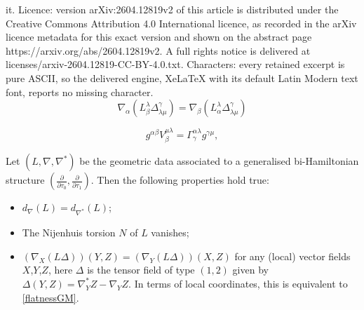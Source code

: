 \documentclass[10pt,a4paper]{amsart}
\newcommand{\Qd}{\Delta}
\newcommand{\Qg}{\Gamma}
\newcommand{\diff}[2]{\frac{\partial #1}{\partial #2}}
\newcommand{\qa}{\alpha}
\newcommand{\qb}{\beta}
\newcommand{\qg}{\gamma}
\newcommand{\ql}{\lambda}
\newcommand{\qt}{\tau}
\begin{document}
it. Licence: version arXiv:2604.12819v2 of this article is distributed under the Creative Commons Attribution 4.0 International licence, as recorded in the arXiv licence metadata for this exact version and shown on the abstract page https://arxiv.org/abs/2604.12819v2. A full rights notice is delivered at licenses/arxiv-2604.12819-CC-BY-4.0.txt. Characters: every retained excerpt is pure ASCII, so the delivered engine, XeLaTeX with its default Latin Modern text font, reports no missing character.
\begin{equation}\label{flatnessGM}
\nabla_\qa\left(L^\ql_\qb\Delta^\qg_{\ql\mu}\right)=\nabla_\qb\left(L^\ql_\qa\Delta^\qg_{\ql\mu}\right)
\end{equation}

\begin{equation}
  \label{AL}
g^{\qa\qb}V_\qb^{\mu\ql} = \Qg^{\qa\ql}_\qg g^{\qg\mu},
\end{equation}

\begin{proposition}
  \label{BY}
  Let $(L,\nabla,\nabla^*)$ be the geometric data associated to a generalised bi-Hamiltonian structure $(\diff{}{\qt_0},\diff{}{\qt_1})$. Then the following properties hold true:
\begin{itemize}
  \item[(1)]$d_\nabla(L) = d_{\nabla^*}(L)$;
  \item[(2)] The Nijenhuis torsion $N$ of $L$ vanishes;
  \item[(3)] $(\nabla_X (L\Qd))(Y,Z) = (\nabla_Y (L\Qd))(X,Z)$ for any (local) vector fields $X$,$Y$,$Z$, here $\Qd$ is the tensor field of type $(1,2)$ given by $\Qd(Y,Z) = \nabla^*_YZ-\nabla_YZ$. In terms of  local coordinates, this is equivalent to \eqref{flatnessGM}.
\end{itemize}
\end{proposition}
\end{document}
